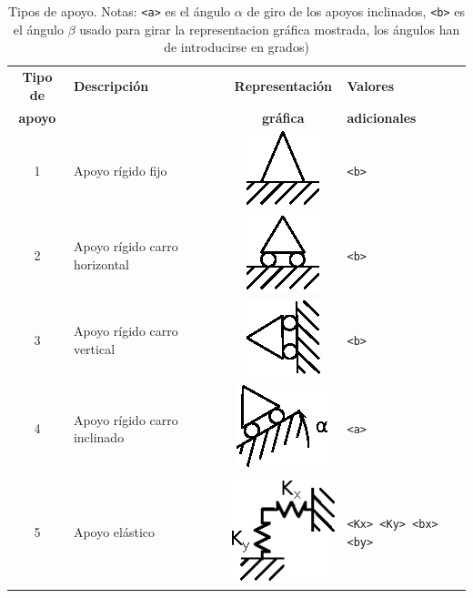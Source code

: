 \documentclass[a4paper,11pt]{article}
\begin{document}
\begin{table}[h]
\begin{center}
\setlength\extrarowheight{2pt}
\begin{tabular}{c p{6cm} c l}
\hline
\textbf{Tipo de} & \textbf{Descripci\'on} & \textbf{Representaci\'on} & \textbf{Valores} \\
\textbf{apoyo}   &                        & \textbf{gr\'afica} & \textbf{adicionales} \\
\hline
1 & Apoyo r\'igido fijo &
\multicolumn{1}{m{2cm}}{\includegraphics{figures/apoyo_fijo.eps}} &
\texttt{<b>} \\
\hline
2 & Apoyo r\'igido carro horizontal & 
\multicolumn{1}{m{2cm}}{\includegraphics{figures/apoyo_carro_horizontal.eps}} &
\texttt{<b>} \\
\hline
3 & Apoyo r\'igido carro vertical & 
\multicolumn{1}{m{2cm}}{\includegraphics{figures/apoyo_carro_vertical.eps}} &
\texttt{<b>} \\
\hline
4 & Apoyo r\'igido carro inclinado & 
\multicolumn{1}{m{2cm}}{\includegraphics{figures/apoyo_inclinado.eps}} & 
\texttt{<a>}\\
\hline
5 & Apoyo el\'astico & 
\multicolumn{1}{m{2cm}}{\includegraphics{figures/apoyo_elastico.eps}} & 
\texttt{<Kx> <Ky> <bx> <by>} \\
\hline
\end{tabular}
\end{center}
\caption{Tipos de apoyo. Notas: \texttt{<a>} es el \'angulo $\alpha$ de giro de los apoyos inclinados, \texttt{<b>} es el \'angulo $\beta$ usado para girar la representacion gr\'afica mostrada, los \'angulos han de introducirse en grados)}
\end{table}
\end{document}

